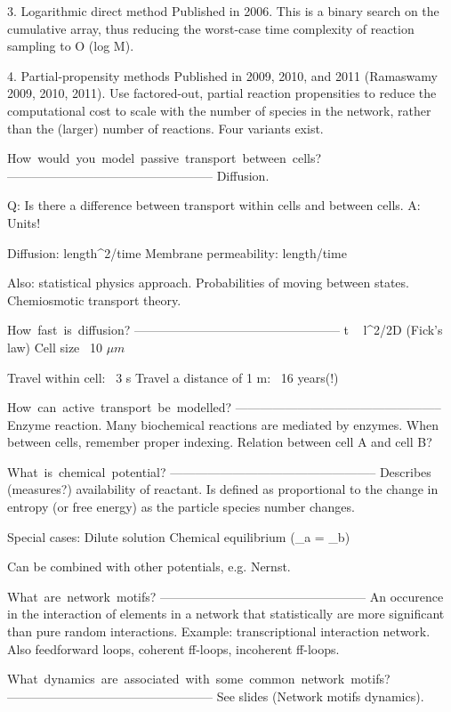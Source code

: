 3. Logarithmic direct method
Published in 2006. This is a binary search on the cumulative array, thus 
reducing the worst-case time complexity of reaction sampling to O (log M).

4. Partial-propensity methods
Published in 2009, 2010, and 2011 (Ramaswamy 2009, 2010, 2011). Use factored-out, 
partial reaction propensities to reduce the computational cost to scale with 
the number of species in the network, rather than the (larger) number of 
reactions. Four variants exist.


How would you model passive transport between cells?
--------------------------------------------------
Diffusion. 

Q: Is there a difference between transport within cells and between cells.
A: Units! 

Diffusion: length^2/time
Membrane permeability: length/time 

Also: statistical physics approach. Probabilities of moving between states. 
Chemiosmotic transport theory. 

How fast is diffusion?
--------------------------------------------------
t ~ l^2/2D (Fick's law)
Cell size ~10 $\mu m$

Travel within cell: ~3 s
Travel a distance of 1 m: ~16 years(!)

How can active transport be modelled?
--------------------------------------------------
Enzyme reaction. Many biochemical reactions are mediated by enzymes.
When between cells, remember proper indexing.  
Relation between cell A and cell B? 

What is chemical potential?
--------------------------------------------------
Describes (measures?) availability of reactant. Is defined as 
proportional to the change in entropy (or free energy) as the particle 
species number changes. 

Special cases: 
Dilute solution
Chemical equilibrium (\mu_a = \mu_b)

Can be combined with other potentials, e.g. Nernst.

What are network motifs?
--------------------------------------------------
An occurence in the interaction of elements in a network that statistically are
more significant than pure random interactions. Example: transcriptional
interaction network. Also feedforward loops, coherent ff-loops, incoherent
ff-loops.  

What dynamics are associated with some common network motifs?
--------------------------------------------------
See slides (Network motifs dynamics). 

